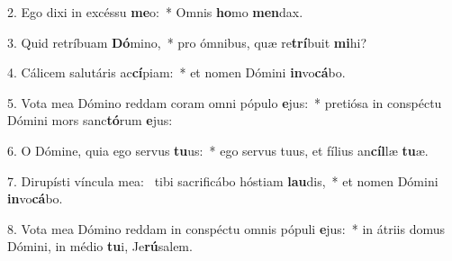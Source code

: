 2. Ego dixi in excéssu \textbf{me}o:~*  Omnis \textbf{ho}mo \textbf{men}dax.\

3. Quid retríbuam \textbf{Dó}mino,~*  pro ómnibus, quæ re\textbf{trí}buit \textbf{mi}hi?\

4. Cálicem salutáris ac\textbf{cí}piam:~*  et nomen Dómini \textbf{in}vo\textbf{cá}bo.\

5. Vota mea Dómino reddam coram omni pópulo \textbf{e}jus:~*  pretiósa in conspéctu Dómini mors sanc\textbf{tó}rum \textbf{e}jus:\

6. O Dómine, quia ego servus \textbf{tu}us:~*  ego servus tuus, et fílius an\textbf{cíl}læ \textbf{tu}æ.\

7. Dirupísti víncula mea: \dag\  tibi sacrificábo hóstiam \textbf{lau}dis,~*  et nomen Dómini \textbf{in}vo\textbf{cá}bo.\

8. Vota mea Dómino reddam in conspéctu omnis pópuli \textbf{e}jus:~*  in átriis domus Dómini, in médio \textbf{tu}i, Je\textbf{rú}salem.\

